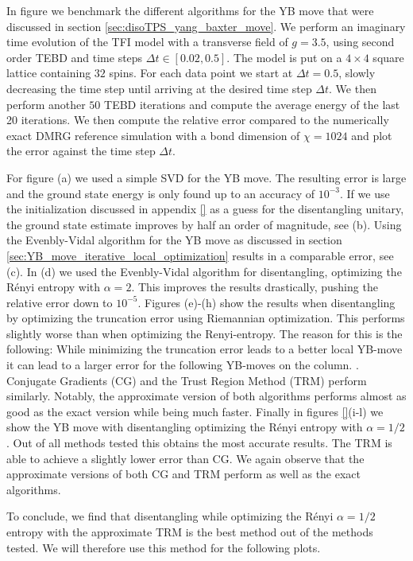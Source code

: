 In figure \figref{} we benchmark the different algorithms for the YB move that were discussed in section \ref{sec:disoTPS_yang_baxter_move}. We perform an imaginary time evolution of the TFI model with a transverse field of $g = 3.5$, using second order TEBD and time steps $\Delta t \in \left[0.02, 0.5\right]$. The model is put on a $4\times4$ square lattice containing $32$ spins. For each data point we start at $\Delta t = 0.5$, slowly decreasing the time step until arriving at the desired time step $\Delta t$. We then perform another $50$ TEBD iterations and compute the average energy of the last 20 iterations. We then compute the relative error compared to the numerically exact DMRG reference simulation with a bond dimension of $\chi = 1024$ and plot the error against the time step $\Delta t$. \par
For figure \figref{}(a) we used a simple SVD for the YB move. The resulting error is large and the ground state energy is only found up to an accuracy of $10^{-3}$. If we use the initialization discussed in appendix \ref{} as a guess for the disentangling unitary, the ground state estimate improves by half an order of magnitude, see \figref{}(b). Using the Evenbly-Vidal algorithm for the YB move as discussed in section \ref{sec:YB_move_iterative_local_optimization} results in a comparable error, see \figref{}(c). In \figref{}(d) we used the Evenbly-Vidal algorithm for disentangling, optimizing the Rényi entropy with $\alpha = 2$. This improves the results drastically, pushing the relative error down to $10^{-5}$. Figures \figref{}(e)-(h) show the results when disentangling by optimizing the truncation error using Riemannian optimization. This performs slightly worse than when optimizing the Renyi-entropy. The reason for this is the following: While minimizing the truncation error leads to a better local YB-move it can lead to a larger error for the following YB-moves on the column. . Conjugate Gradients (CG) and the Trust Region Method (TRM) perform similarly. Notably, the approximate version of both algorithms performs almost as good as the exact version while being much faster. Finally in figures \ref{}(i-l) we show the YB move with disentangling optimizing the Rényi entropy with $\alpha = 1/2$. Out of all methods tested this obtains the most accurate results. The TRM is able to achieve a slightly lower error than CG. We again observe that the approximate versions of both CG and TRM perform as well as the exact algorithms. \par
To conclude, we find that disentangling while optimizing the Rényi $\alpha=1/2$ entropy with the approximate TRM is the best method out of the methods tested. We will therefore use this method for the following plots. \par
